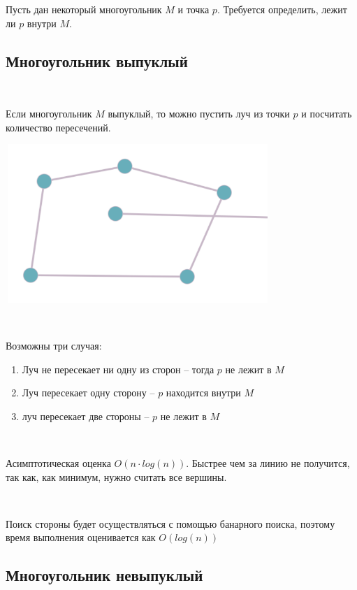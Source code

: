 
Пусть дан некоторый многоугольник $M$ и точка $p$. Требуется определить, лежит ли $p$ внутри $M$.

\subsection{Многоугольник выпуклый}

\

Если многоугольник $M$ выпуклый, то можно пустить луч из точки $p$ и посчитать количество пересечений.

\hspace{1cm} \includegraphics[height=6cm, width=10cm]{vipukli.png}

\

Возможны три случая:
\begin{enumerate}
    \item Луч не пересекает ни одну из сторон -- тогда $p$ не лежит в $M$
    \item Луч пересекает одну сторону -- $p$ находится внутри $M$
    \item луч пересекает две стороны -- $p$ не лежит в $M$
\end{enumerate}

\

Асимптотическая оценка $O(n \cdot log(n))$. Быстрее чем за линию не получится, так как, как минимум, нужно считать все вершины.

\

Поиск стороны будет осуществляться с помощью банарного  поиска, поэтому время выполнения оценивается как $O(log(n))$

\subsection{Многоугольник невыпуклый}

\

